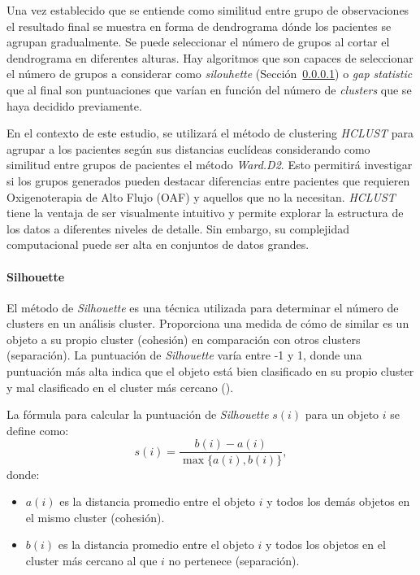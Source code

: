 Una vez establecido que se entiende como similitud entre grupo de observaciones el resultado final se muestra en forma de dendrograma dónde los pacientes se agrupan gradualmente. Se puede seleccionar el número de grupos al cortar el dendrograma en diferentes alturas. Hay algoritmos que son capaces de seleccionar el número de grupos a considerar como \textit{silouhette} (Sección~\ref{sec:silhouette}) o \textit{gap statistic} que al final son puntuaciones que varían en función del número de \textit{clusters} que se haya decidido previamente.



En el contexto de este estudio, se utilizará el método de clustering \textit{HCLUST} para agrupar a los pacientes según sus distancias euclídeas considerando como similitud entre grupos de pacientes el método \textit{Ward.D2}. Esto permitirá investigar si los grupos generados pueden destacar diferencias entre pacientes que requieren Oxigenoterapia de Alto Flujo (OAF) y aquellos que no la necesitan. \textit{HCLUST} tiene la ventaja de ser visualmente intuitivo y permite explorar la estructura de los datos a diferentes niveles de detalle. Sin embargo, su complejidad computacional puede ser alta en conjuntos de datos grandes.

\paragraph{Silhouette}\label{sec:silhouette}

El método de \textit{Silhouette} es una técnica utilizada para determinar el número de clusters en un análisis cluster. Proporciona una medida de cómo de similar es un objeto a su propio cluster (cohesión) en comparación con otros clusters (separación). La puntuación de \textit{Silhouette} varía entre -1 y 1, donde una puntuación más alta indica que el objeto está bien clasificado en su propio cluster y mal clasificado en el cluster más cercano (\cite{rousseeuw1987silhouettes}).

La fórmula para calcular la puntuación de \textit{Silhouette} \(s(i)\) para un objeto \(i\) se define como:
\[ s(i) = \frac{b(i) - a(i)}{\max\{a(i), b(i)\}},\]
donde:
\begin{itemize}
    \item \(a(i)\) es la distancia promedio entre el objeto \(i\) y todos los demás objetos en el mismo cluster (cohesión).
    \item \(b(i)\) es la distancia promedio entre el objeto \(i\) y todos los objetos en el cluster más cercano al que \(i\) no pertenece (separación).
\end{itemize}

